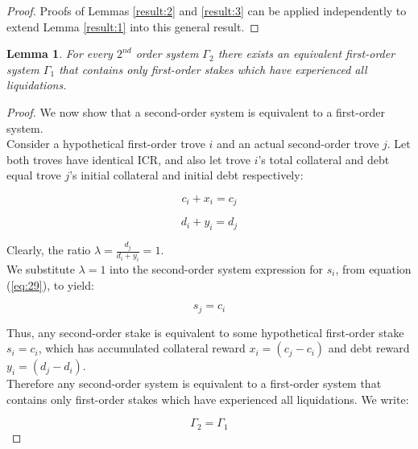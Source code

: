 \documentclass[reqno]{article}
\newtheorem{lemma}[theorem]{Lemma}
\begin{document}
\begin{proof}
  Proofs of Lemmas \ref{result:2} and \ref{result:3} can be applied independently to extend Lemma \ref{result:1} into this general result.
\end{proof}

\begin{lemma} \label{result:5}
  For every $2^{nd}$ order system $\Gamma_2$ there exists an equivalent first-order system $\Gamma_1$ that contains only first-order stakes which have experienced all liquidations.
\end{lemma}

\begin{proof}
We now show that a second-order system is equivalent to a first-order system.\\

Consider a hypothetical first-order trove $i$ and an actual second-order trove $j$. Let both troves have identical ICR, and also let trove $i$’s total collateral and debt equal trove $j$’s initial collateral and initial debt respectively:

\begin{equation} 
    c_i+x_i=c_j
\end{equation}

\begin{equation} 
    d_i+y_i=d_j
\end{equation}

\bigskip
Clearly, the ratio  $\lambda = \frac{d_j}{d_i+y_i} = 1$.\\

We substitute $\lambda=1$ into the second-order system expression for $s_i$, from equation (\ref{eq:29}), to yield:

\begin{equation} 
    s_j=c_i
\end{equation}

\bigskip
Thus, any second-order stake is equivalent to some hypothetical first-order stake $s_i=c_i$, which has accumulated collateral reward $x_i=(c_j-c_i)$ and debt reward $y_i=(d_j-d_i)$.\\

Therefore any second-order system is equivalent to a first-order system that contains only first-order stakes which have experienced all liquidations. We write:

\begin{equation} 
    \Gamma_2=\Gamma_1
\end{equation}
\end{proof}
\end{document}
